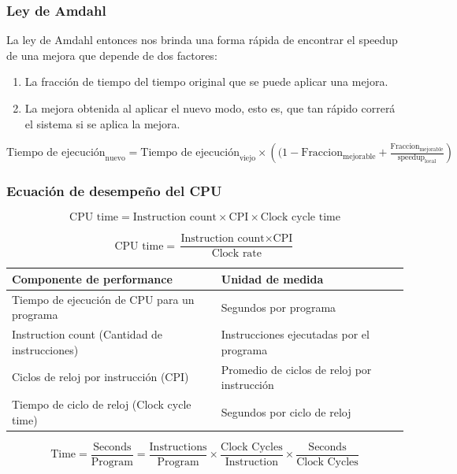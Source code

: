 \documentclass{beamer}
\begin{document}
\begin{frame}
\frametitle{Ley de Amdahl}
La ley de Amdahl entonces nos brinda una forma rápida de encontrar el speedup de una mejora que depende de dos factores:

\begin{enumerate}
 \item La fracción de tiempo del tiempo original que se puede aplicar una mejora.
 \item La mejora obtenida al aplicar el nuevo modo, esto es, que tan rápido correrá el sistema si se aplica la mejora.
\end{enumerate}

\bigskip
\tiny
$
\text{Tiempo de ejecución}_\text{nuevo} = \text{Tiempo de ejecución}_\text{viejo}  \times \left( (1 -  \text{Fraccion}_\text{mejorable} + \frac{\text{Fraccion}_\text{mejorable}}{\text{speedup}_\text{local}} \right)
$

\end{frame}

\begin{frame}
\frametitle{Ecuación de desempeño del CPU}
\[ \text{CPU time} = \text{Instruction count} \times \text{CPI} \times \text{Clock cycle time} \]

\[ \text{CPU time} = \frac{\text{Instruction count} \times \text{CPI}}{ \text{Clock rate}} \]

\tiny
\begin{table}[h!]
\centering
\begin{tabular}{|l|l|}
\hline
   
\textbf{Componente de performance} & \textbf{Unidad de medida}  \\ \hline
Tiempo de ejecución de CPU para un programa & Segundos por programa \\ \hline
Instruction count (Cantidad de instrucciones) & Instrucciones ejecutadas por el programa \\ \hline
Ciclos de reloj por instrucción (CPI) & Promedio de ciclos de reloj por instrucción \\ \hline
Tiempo de ciclo de reloj (Clock cycle time) & Segundos por ciclo de reloj \\ \hline
\end{tabular}
\end{table}

\[ \text{Time} = \frac{\text{Seconds}}{\text{Program}}= \frac{\text{Instructions}}{\text{Program}} \times \frac{\text{Clock Cycles}}{\text{Instruction}} \times \frac{\text{Seconds}}{\text{Clock Cycles}} \]


\end{frame}
\end{document}
